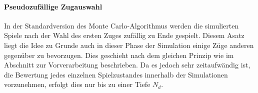 \paragraph{Pseudozufällige Zugauswahl}
In der Standardversion des Monte Carlo-Algorithmus werden die simulierten Spiele nach der Wahl des ersten Zuges zufällig zu Ende gespielt. Diesem Asatz liegt die Idee zu Grunde auch in dieser Phase der Simulation einige Züge anderen gegenüber zu bevorzugen. Dies geschieht nach dem gleichen Prinzip wie im Abschnitt zur Vorverarbeitung beschrieben. Da es jedoch sehr zeitaufwändig ist, die Bewertung jedes einzelnen Spielzustandes innerhalb der Simulationen vorzunehmen, erfolgt dies nur bis zu einer Tiefe $N_{d}$.